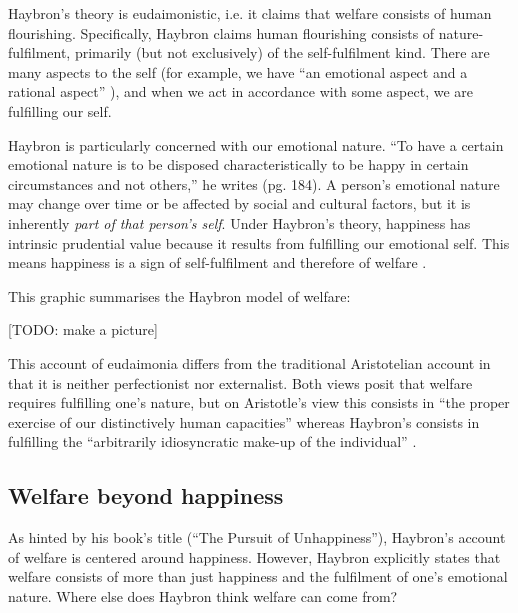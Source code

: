 \documentclass{article}
\begin{document}
Haybron's theory is eudaimonistic, i.e. it claims that welfare consists of human flourishing. Specifically, Haybron claims human flourishing consists of nature-fulfilment, primarily (but not exclusively) of the self-fulfilment kind. There are many aspects to the self (for example, we have ``an emotional aspect and a rational aspect'' \citep[pg. 193]{haybron2008pursuit}), and when we act in accordance with some aspect, we are fulfilling our self.

Haybron is particularly concerned with our emotional nature. ``To have a certain emotional nature is to be disposed characteristically to be happy in certain circumstances and not others,'' he writes (pg. 184). A person's emotional nature may change over time or be affected by social and cultural factors, but it is inherently \textit{part of that person's self}. Under Haybron's theory, happiness has intrinsic prudential value because it results from fulfilling our emotional self. This means happiness is a sign of self-fulfilment and therefore of welfare \citep[pg. 178]{haybron2008pursuit}.

This graphic summarises the Haybron model of welfare:

[TODO: make a picture]

This account of eudaimonia differs from the traditional Aristotelian account in that it is neither perfectionist nor externalist. Both views posit that welfare requires fulfilling one's nature, but on Aristotle's view this consists in ``the proper exercise of our distinctively human capacities'' whereas Haybron's consists in fulfilling the ``arbitrarily idiosyncratic make-up of the individual'' \citep[pg. 193]{haybron2008pursuit}.

\subsection{Welfare beyond happiness}

As hinted by his book's title (``The Pursuit of Unhappiness''), Haybron's account of welfare is centered around happiness. However, Haybron explicitly states that welfare consists of more than just happiness and the fulfilment of one's emotional nature. Where else does Haybron think welfare can come from?
\end{document}
